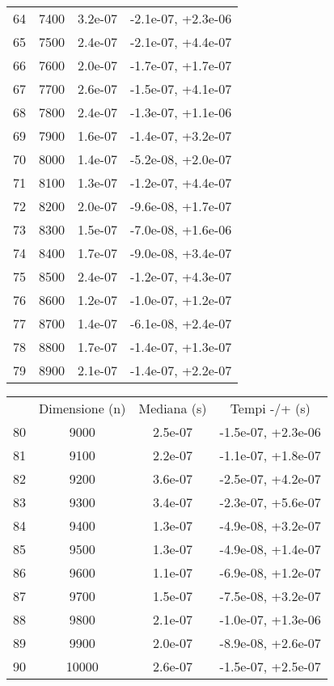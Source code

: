 \begin{table}
\begin{adjustbox}{width=1\textwidth/2}
\begin{tabular}{|c|c|c|c|}
\cline{1-4}
64 & 7400 & 3.2e-07 & -2.1e-07, +2.3e-06 \\
\cline{1-4}
65 & 7500 & 2.4e-07 & -2.1e-07, +4.4e-07 \\
\cline{1-4}
66 & 7600 & 2.0e-07 & -1.7e-07, +1.7e-07 \\
\cline{1-4}
67 & 7700 & 2.6e-07 & -1.5e-07, +4.1e-07 \\
\cline{1-4}
68 & 7800 & 2.4e-07 & -1.3e-07, +1.1e-06 \\
\cline{1-4}
69 & 7900 & 1.6e-07 & -1.4e-07, +3.2e-07 \\
\cline{1-4}
70 & 8000 & 1.4e-07 & -5.2e-08, +2.0e-07 \\
\cline{1-4}
71 & 8100 & 1.3e-07 & -1.2e-07, +4.4e-07 \\
\cline{1-4}
72 & 8200 & 2.0e-07 & -9.6e-08, +1.7e-07 \\
\cline{1-4}
73 & 8300 & 1.5e-07 & -7.0e-08, +1.6e-06 \\
\cline{1-4}
74 & 8400 & 1.7e-07 & -9.0e-08, +3.4e-07 \\
\cline{1-4}
75 & 8500 & 2.4e-07 & -1.2e-07, +4.3e-07 \\
\cline{1-4}
76 & 8600 & 1.2e-07 & -1.0e-07, +1.2e-07 \\
\cline{1-4}
77 & 8700 & 1.4e-07 & -6.1e-08, +2.4e-07 \\
\cline{1-4}
78 & 8800 & 1.7e-07 & -1.4e-07, +1.3e-07 \\
\cline{1-4}
79 & 8900 & 2.1e-07 & -1.4e-07, +2.2e-07 \\
\cline{1-4}
\end{tabular}
\end{adjustbox}
\end{table}

\begin{table}
\centering
\begin{adjustbox}{width=1\textwidth/2}
\begin{tabular}{|c|c|c|c|}
\hline
 & Dimensione (n) & Mediana (s) & Tempi -/+ (s) \\
80 & 9000 & 2.5e-07 & -1.5e-07, +2.3e-06 \\
\cline{1-4}
81 & 9100 & 2.2e-07 & -1.1e-07, +1.8e-07 \\
\cline{1-4}
82 & 9200 & 3.6e-07 & -2.5e-07, +4.2e-07 \\
\cline{1-4}
83 & 9300 & 3.4e-07 & -2.3e-07, +5.6e-07 \\
\cline{1-4}
84 & 9400 & 1.3e-07 & -4.9e-08, +3.2e-07 \\
\cline{1-4}
85 & 9500 & 1.3e-07 & -4.9e-08, +1.4e-07 \\
\cline{1-4}
86 & 9600 & 1.1e-07 & -6.9e-08, +1.2e-07 \\
\cline{1-4}
87 & 9700 & 1.5e-07 & -7.5e-08, +3.2e-07 \\
\cline{1-4}
88 & 9800 & 2.1e-07 & -1.0e-07, +1.3e-06 \\
\cline{1-4}
89 & 9900 & 2.0e-07 & -8.9e-08, +2.6e-07 \\
\cline{1-4}
90 & 10000 & 2.6e-07 & -1.5e-07, +2.5e-07 \\
\cline{1-4}
\end{tabular}
\end{adjustbox}
\end{table}

